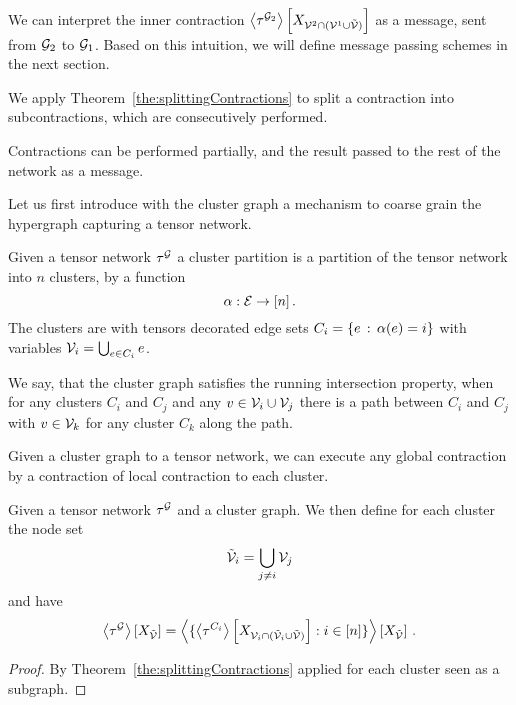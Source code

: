 We can interpret the inner contraction $\left\langle \tau^{\mathcal{G}_2}\right\rangle \left[ X_{\mathcal{V}^{2}\cap(\mathcal{V}^{1}\cup\tilde{\mathcal{V}})} \right]$ as a message, sent from $\mathcal{G}_2$ to $\mathcal{G}_1$.
Based on this intuition, we will define message passing schemes in the next section.




We apply Theorem~\ref{the:splittingContractions} to split a contraction into subcontractions, which are consecutively performed.

Contractions can be performed partially, and the result passed to the rest of the network as a message.


Let us first introduce with the cluster graph a mechanism to coarse grain the hypergraph capturing a tensor network.

\begin{definition}
	Given a tensor network $\tau^{\mathcal{G}}$ a cluster partition is a partition of the tensor network into $n$ clusters, by a function
		\[ \alpha : \mathcal{E} \rightarrow [n] \, . \]
	The clusters are with tensors decorated edge sets $C_{i} = \{e \, : \, \alpha(e) = i\}$ with variables $\mathcal{V}_i = \bigcup_{e \in C_{i}} e$.

	We say, that the cluster graph satisfies the running intersection property, when for any clusters $C_i$ and $C_j$ and any $v\in\mathcal{V}_i\cup\mathcal{V}_j$ there is a path between $C_i$ and $C_j$ with $v\in\mathcal{V}_k$ for any cluster $C_k$ along the path.
\end{definition}

Given a cluster graph to a tensor network, we can execute any global contraction by a contraction of local contraction to each cluster.

\begin{theorem}\label{the:contractionClusterSplit}
	Given a tensor network $\tau^{\mathcal{G}}$ and a cluster graph.
	We then define for each cluster the node set
	\begin{align*}
		\tilde{\mathcal{V}}_i = \bigcup_{j\neq i} \mathcal{V}_j
	\end{align*}
	and have
		\[ \left\langle \tau^{\mathcal{G}}\right\rangle \left[ X_{\tilde{\mathcal{V}}} \right] = 
		\left\langle 
			\{ \left\langle \tau^{C_{i}}\right\rangle \left[ X_{\mathcal{V}_i \cap (\tilde{\mathcal{V}}_i\cup\tilde{\mathcal{V}})} \right]  : i \in [n]\}
		\right\rangle \left[ X_{\tilde{\mathcal{V}}} \right]  \, . \]
\end{theorem}
\begin{proof}
	By Theorem~\ref{the:splittingContractions} applied for each cluster seen as a subgraph.
\end{proof}



